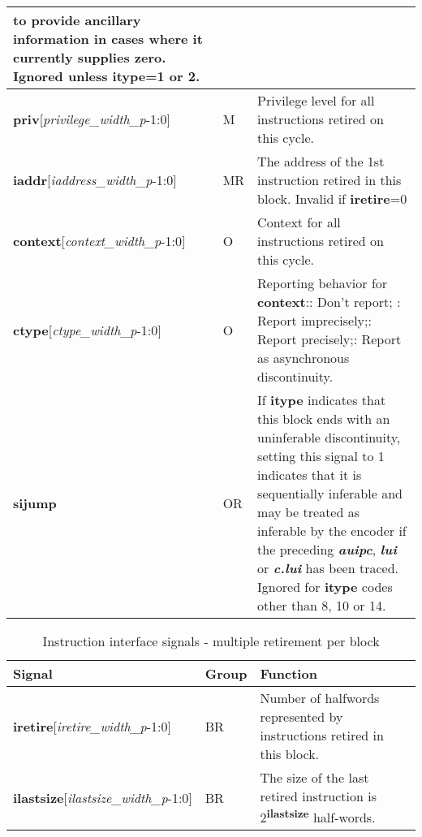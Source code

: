 \begin{table}[htp]
\begin{tabulary}{\textwidth}{|l|l|p{80mm}|}
        to provide ancillary information in cases where it currently supplies zero.
        Ignored unless \textbf{itype}=1 or 2.\\
        \hline
        \textbf{priv}[\textit{privilege\_width\_p}-1:0] & M & Privilege level for all instructions retired on this cycle.\\
        \hline
        \textbf{iaddr}[\textit{iaddress\_width\_p}-1:0] & MR & The address of the 1st instruction retired in this block.
        Invalid if \textbf{iretire}=0 \\
        \hline
        \textbf{context}[\textit{context\_width\_p}-1:0] & O & Context for all instructions retired on this cycle.\\
        \hline
        \textbf{ctype}[\textit{ctype\_width\_p}-1:0] & O & Reporting behavior for \textbf{context}:: Don't report; : Report imprecisely;: Report precisely;: Report as asynchronous discontinuity.\\
        \hline
        \textbf{sijump} & OR & If \textbf{itype} indicates that this block ends with an uninferable discontinuity, setting this signal to 1 
        indicates that it is sequentially inferable and may be treated as inferable by the encoder if the preceding 
        \textbf{\textit{auipc}}, \textbf{\textit{lui}} or \textbf{\textit{c.lui}} has been traced.  
        Ignored for \textbf{itype} codes other than 8, 10 or 14.\\
        \hline
    \end{tabulary}
\end{table}

\begin{table}[htp]
    \centering
    \caption{Instruction interface signals - multiple retirement per block}
    \label{tab:multi-ingress}
    \begin{tabulary}{\textwidth}{|l|l|p{80mm}|}
        \hline
        \textbf{Signal} & \textbf{Group} & \textbf{Function} \\
        \hline
        \textbf{iretire}[\textit{iretire\_width\_p}-1:0] & BR & Number of halfwords represented by instructions retired in this block.\\
        \hline
        \textbf{ilastsize}[\textit{ilastsize\_width\_p}-1:0] & BR & The size of the last retired instruction is 2\textsuperscript{\textbf{ilastsize}} half-words.\\
        \hline
    \end{tabulary}
\end{table}

